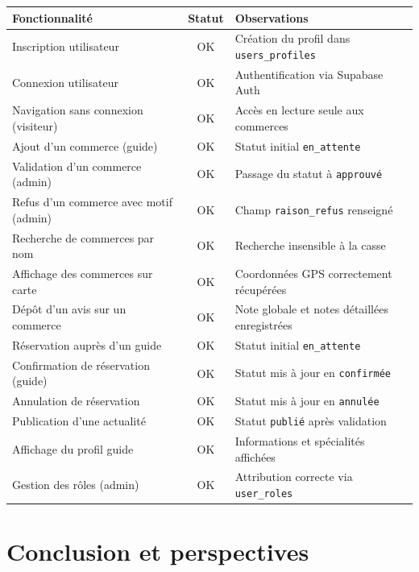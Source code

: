 \documentclass[12pt,a4paper]{report}
\begin{document}
\begin{table}[H]
\centering

\begin{tabular}{|p{5.5cm}|c|p{5.5cm}|}
\hline
\textbf{Fonctionnalité} & \textbf{Statut} & \textbf{Observations} \\
\hline
Inscription utilisateur & OK & Création du profil dans \texttt{users\_profiles} \\
\hline
Connexion utilisateur & OK & Authentification via Supabase Auth \\
\hline
Navigation sans connexion (visiteur) & OK & Accès en lecture seule aux commerces \\
\hline
Ajout d'un commerce (guide) & OK & Statut initial \texttt{en\_attente} \\
\hline
Validation d'un commerce (admin) & OK & Passage du statut à \texttt{approuvé} \\
\hline
Refus d'un commerce avec motif (admin) & OK & Champ \texttt{raison\_refus} renseigné \\
\hline
Recherche de commerces par nom & OK & Recherche insensible à la casse \\
\hline
Affichage des commerces sur carte & OK & Coordonnées GPS correctement récupérées \\
\hline
Dépôt d'un avis sur un commerce & OK & Note globale et notes détaillées enregistrées \\
\hline
Réservation auprès d'un guide & OK & Statut initial \texttt{en\_attente} \\
\hline
Confirmation de réservation (guide) & OK & Statut mis à jour en \texttt{confirmée} \\
\hline
Annulation de réservation & OK & Statut mis à jour en \texttt{annulée} \\
\hline
Publication d'une actualité & OK & Statut \texttt{publié} après validation \\
\hline
Affichage du profil guide & OK & Informations et spécialités affichées \\
\hline
Gestion des rôles (admin) & OK & Attribution correcte via \texttt{user\_roles} \\
\hline
\end{tabular}

\end{table}


\chapter{Conclusion et perspectives}
\end{document}
